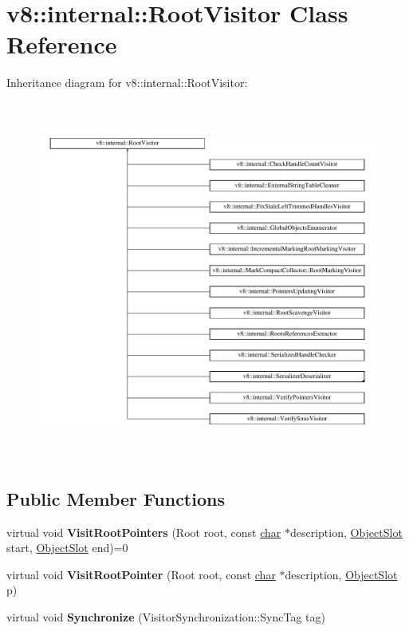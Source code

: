 \hypertarget{classv8_1_1internal_1_1RootVisitor}{}\section{v8\+:\+:internal\+:\+:Root\+Visitor Class Reference}
\label{classv8_1_1internal_1_1RootVisitor}
Inheritance diagram for v8\+:\+:internal\+:\+:Root\+Visitor\+:\begin{figure}[H]
\begin{center}
\leavevmode
\includegraphics[height=11.878788cm]{classv8_1_1internal_1_1RootVisitor}
\end{center}
\end{figure}
\subsection*{Public Member Functions}
\begin{DoxyCompactItemize}
\item 
\mbox{\label{classv8_1_1internal_1_1RootVisitor_af16ced6be6315fcbeb952056d0dfcbf6}} 
virtual void {\bfseries Visit\+Root\+Pointers} (Root root, const \mbox{\hyperlink{classchar}{char}} $\ast$description, \mbox{\hyperlink{classv8_1_1internal_1_1ObjectSlot}{Object\+Slot}} start, \mbox{\hyperlink{classv8_1_1internal_1_1ObjectSlot}{Object\+Slot}} end)=0
\item 
\mbox{\label{classv8_1_1internal_1_1RootVisitor_a6be2116e80a108771c1d0b680841f61e}} 
virtual void {\bfseries Visit\+Root\+Pointer} (Root root, const \mbox{\hyperlink{classchar}{char}} $\ast$description, \mbox{\hyperlink{classv8_1_1internal_1_1ObjectSlot}{Object\+Slot}} p)
\item 
\mbox{\label{classv8_1_1internal_1_1RootVisitor_a752563243ef0ddd20e233472bf6c2a4f}} 
virtual void {\bfseries Synchronize} (Visitor\+Synchronization\+::\+Sync\+Tag tag)
\end{DoxyCompactItemize}

